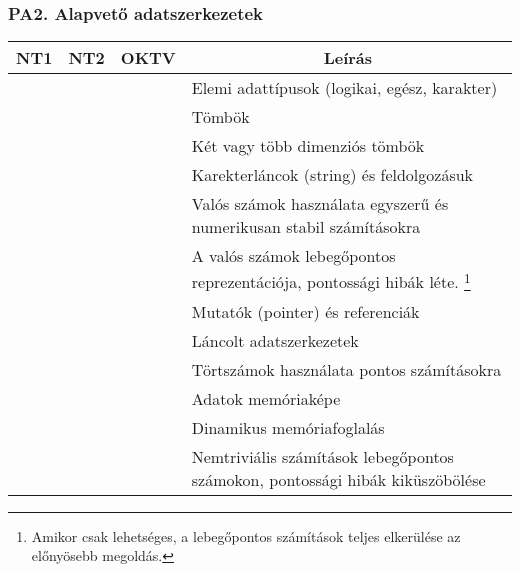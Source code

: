 \documentclass[a4paper,11pt,oneside]{article}
\newcommand{\cmark}{\ding{51}}%
\newcommand{\xmark}{\ding{55}}%
\newcommand{\cincl}{{\small\cmark}}
\newcommand{\ccode}{{\small\cmark\faFileText}}
\newcommand{\cnfoc}{{\small\faQuestion}}
\newcommand{\cemay}{{\small\xmark\faQuestionCircle}}
\newcommand{\cexcl}{{\small\xmark}}
\newcommand{\Icodeonly}{\item[\hbox to 1.8em{\ccode\hfill}]}
\newcommand{\Inofocus}{\item[\hbox to 1.8em{\cnfoc\hfill}]}
\newcommand{\ctable}[1]{
    \begin{center}
        \begin{longtable}{ | C | C | C | m{8cm} | }
        \hline
        \textbf{NT1} & \textbf{NT2} & \textbf{OKTV} & \multicolumn{1}{|c|}{\textbf{Leírás}} \\ \hline
        \endhead
        #1
        \end{longtable}
    \end{center}
}
\begin{document}
\subsubsection*{PA2. Alapvető adatszerkezetek} %

\ctable {
    \cincl & \cincl & \cincl & Elemi adattípusok (logikai, egész, karakter)
    \\ \hline %
    \cincl & \cincl & \cincl & Tömbök
    \\ \hline %
    \cincl & \cincl & \cincl & Két vagy több dimenziós tömbök
    \\ \hline
    \cincl & \cincl & \cincl & Karekterláncok (string) és feldolgozásuk
    \\ \hline %
    \ccode & \ccode & \ccode & Valós számok használata egyszerű és numerikusan stabil számításokra
    \\ \hline %
    \ccode & \ccode & \ccode & A valós számok lebegőpontos reprezentációja, pontossági hibák léte.
        \footnote{Amikor csak lehetséges, a lebegőpontos számítások teljes elkerülése az előnyösebb megoldás.} %
    \\ \hline %
    \cemay & \ccode & \cincl & Mutatók (pointer) és referenciák
    \\ \hline %
    \cexcl & \cemay & \cincl & Láncolt adatszerkezetek
    \\ \hline %
    \cemay & \cemay & \ccode & Törtszámok használata pontos számításokra
    \\ \hline %
    \cnfoc & \cnfoc & \cnfoc & Adatok memóriaképe
    \\ \hline %
    \cnfoc & \cnfoc & \cnfoc & Dinamikus memóriafoglalás
    \\ \hline %
    \cexcl & \cexcl & \cexcl & Nemtriviális számítások lebegőpontos számokon, pontossági hibák kiküszöbölése
    \\ \hline %
}
\end{document}
